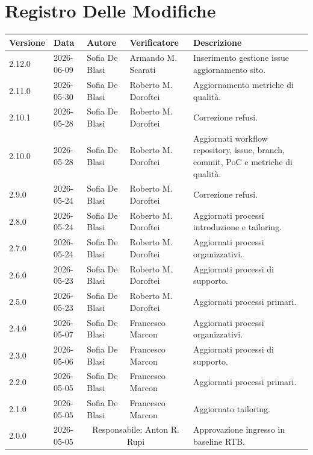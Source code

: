 \section*{Registro Delle Modifiche}

\renewcommand{\arraystretch}{1.5}
\begin{longtable}{>{\ttfamily\small}l l l l p{4cm}}
  \toprule
  \textbf{Versione} & \textbf{Data} & \textbf{Autore}
    & \textbf{Verificatore} & \textbf{Descrizione} \\
  \midrule
  \endhead
  2.12.0 & 2026-06-09 & Sofia De Blasi & Armando M. Scarati & Inserimento gestione issue aggiornamento sito. \\[4pt]
  2.11.0 & 2026-05-30 & Sofia De Blasi & Roberto M. Doroftei & Aggiornamento metriche di qualità. \\[4pt]
  2.10.1 & 2026-05-28 & Sofia De Blasi & Roberto M. Doroftei & Correzione refusi. \\[4pt]
  2.10.0 & 2026-05-28 & Sofia De Blasi & Roberto M. Doroftei &  Aggiornati workflow repository, issue, branch, commit, PoC e metriche di qualità.\\[4pt]
  2.9.0 & 2026-05-24 & Sofia De Blasi & Roberto M. Doroftei & Correzione refusi. \\[4pt]
  2.8.0 & 2026-05-24 & Sofia De Blasi & Roberto M. Doroftei & Aggiornati processi introduzione e tailoring. \\[4pt]
  2.7.0 & 2026-05-24 & Sofia De Blasi & Roberto M. Doroftei & Aggiornati processi organizzativi. \\[4pt]
  2.6.0 & 2026-05-23 & Sofia De Blasi & Roberto M. Doroftei & Aggiornati processi di supporto. \\[4pt]
  2.5.0 & 2026-05-23 & Sofia De Blasi & Roberto M. Doroftei & Aggiornati processi primari. \\[4pt]
  2.4.0 & 2026-05-07 & Sofia De Blasi & Francesco Marcon & Aggiornati processi organizzativi. \\[4pt]
  2.3.0 & 2026-05-06 & Sofia De Blasi & Francesco Marcon & Aggiornati processi di supporto. \\[4pt]
  2.2.0 & 2026-05-05 & Sofia De Blasi & Francesco Marcon & Aggiornati processi primari. \\[4pt]
  2.1.0 & 2026-05-05 & Sofia De Blasi & Francesco Marcon & Aggiornato tailoring. \\[4pt]
  2.0.0 & 2026-05-05 & \multicolumn{2}{c}{Responsabile: Anton R. Rupi} & Approvazione ingresso in baseline RTB. \\[4pt]

\end{longtable}
